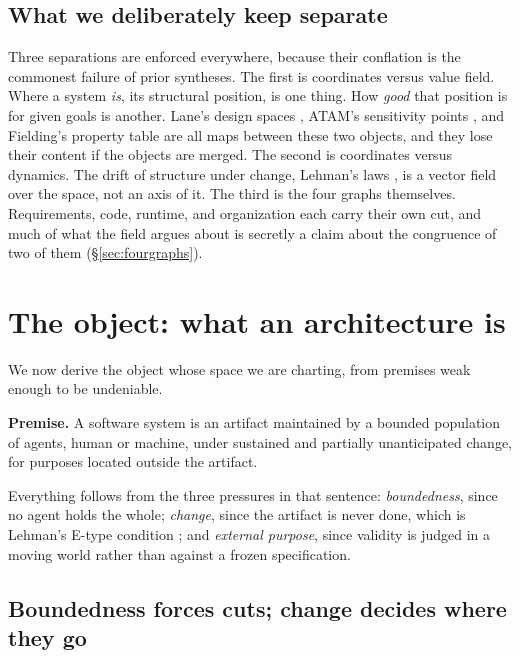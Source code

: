 \documentclass[11pt,oneside]{article}
\theoremstyle{definition}
\begin{document}
\subsection{What we deliberately keep separate}

Three separations are enforced everywhere, because their conflation is the commonest failure of
prior syntheses. The first is coordinates versus value field. Where a system \emph{is}, its
structural position, is one thing. How \emph{good} that position is for given goals is another.
Lane's design spaces \cite{lane1990}, ATAM's sensitivity points \cite{atam2000}, and Fielding's
property table \cite{fielding2000} are all maps between these two objects, and they lose their
content if the objects are merged. The second is coordinates versus dynamics. The drift of
structure under change, Lehman's laws \cite{lehman1980}, is a vector field over the space, not
an axis of it. The third is the four graphs themselves. Requirements, code, runtime, and
organization each carry their own cut, and much of what the field argues about is secretly a
claim about the congruence of two of them (\S\ref{sec:fourgraphs}).

\section{The object: what an architecture is}\label{sec:object}

We now derive the object whose space we are charting, from premises weak enough to be
undeniable.

\textbf{Premise.} A software system is an artifact maintained by a bounded population of agents,
human or machine, under sustained and partially unanticipated change, for purposes located
outside the artifact.

Everything follows from the three pressures in that sentence: \emph{boundedness}, since no agent
holds the whole; \emph{change}, since the artifact is never done, which is Lehman's E-type
condition \cite{lehman1980}; and \emph{external purpose}, since validity is judged in a moving
world rather than against a frozen specification.

\subsection{Boundedness forces cuts; change decides where they go}
\end{document}

